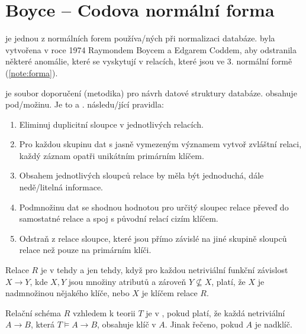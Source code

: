 \section{Boyce -- Codova normální forma}
 je jednou z normálních forem používa\-/ných při normalizaci databáze.  byla vytvořena v roce 1974 Raymondem Boycem a Edgarem Coddem, aby odstranila některé anomálie, které se vyskytují v relacích, které jsou ve $3.$ normální formě (\ref{note:forma}).

\begin{upnote}\label{note:forma}
 je soubor doporučení (metodika) pro návrh datové struktury databáze.  obsahuje pod\-/možinu. Je to  a .  následu\-/jící pravidla:
\begin{enumerate}
\item Eliminuj duplicitní sloupce v jednotlivých relacích.
\item Pro každou skupinu dat s jasně vymezeným významem vytvoř zvláštní relaci, každý záznam opatři unikátním primárním klíčem.
\item Obsahem jednotlivých sloupců relace by měla být jednoduchá, dále nedě\-/litelná informace.
\item Podmnožinu dat se shodnou hodnotou pro určitý sloupec relace převeď do samostatné relace a spoj s původní relací cizím klíčem.
\item Odstraň z relace sloupce, které jsou přímo závislé na jiné skupině sloupců relace než pouze na primárním klíči.
\end{enumerate}
\end{upnote}

\begin{uptheorem}
Relace $R$ je v  tehdy a jen tehdy, když pro každou netriviální funkční závislost $X \to Y$, kde $X, Y$ jsou množiny atributů a zároveň $Y \nsubseteq X$, platí, že $X$ je nadmnožinou nějakého klíče, nebo $X$ je klíčem relace $R$. 
\end{uptheorem}

\begin{uptheorem}
Relační schéma $R$ vzhledem k teorii $T$ je v , pokud platí, že každá netriviální $A \to B$, která  $T \vDash A \to B$, obsahuje klíč v $A$. Jinak řečeno, pokud $A$ je nadklíč.
\end{uptheorem}

